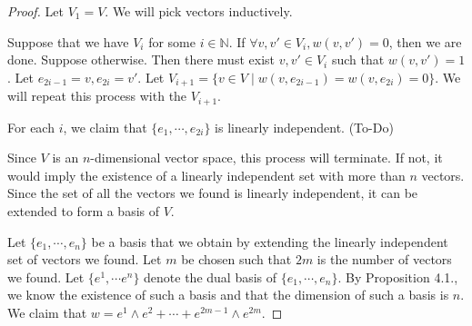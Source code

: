 \documentclass[12pt, psamsfonts]{amsart}
\theoremstyle{definition}
\theoremstyle{remark}
\numberwithin{equation}{section}
\begin{document}
\begin{proof}
  Let $V_1 = V$.
  We will pick vectors inductively.

  Suppose that we have $V_i$ for some $i \in \mathbb{N}$.
  If $\forall v, v' \in V_i, w(v, v')  = 0$, then we are done.
  Suppose otherwise.
  Then there must exist $v, v' \in V_i$ such that $w(v, v') = 1$.
  Let $e_{2i - 1} = v, e_{2i} = v'$.
  Let $V_{i + 1} = \{ v \in V \mid w(v, e_{2i - 1}) = w(v, e_{2i}) = 0 \}$.
  We will repeat this process with the $V_{i + 1}$.

  For each $i$, we claim that $\{ e_1, \cdots, e_{2i} \}$ is linearly independent.
  (To-Do)

  Since $V$ is an $n$-dimensional vector space, this process will terminate.
  If not, it would imply the existence of a linearly independent set with more than $n$ vectors.
  Since the set of all the vectors we found is linearly independent, it can be extended to form a basis of $V$.

  Let $\{ e_1, \cdots, e_n \}$ be a basis that we obtain by extending the linearly independent set of vectors we found.
  Let $m$ be chosen such that $2m$ is the number of vectors we found.
  Let $\{ e^1, \cdots e^n \}$ denote the dual basis of $\{ e_1, \cdots, e_n \}$.
  By Proposition 4.1., we know the existence of such a basis and that the dimension of such a basis is $n$.
  We claim that $w = e^1 \wedge e^2 + \cdots + e^{2m - 1} \wedge e^{2m}$.


\end{proof}
\end{document}

